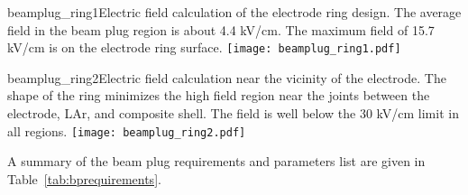 \begin{cdrfigure}{beamplug_ring1}{Electric field calculation of the electrode ring design. The average field in the beam plug region is about 4.4 kV/cm. The maximum field of 15.7 kV/cm is on the electrode ring surface. }
  \texttt{[image: beamplug\_ring1.pdf]}
\end{cdrfigure}

\begin{cdrfigure}{beamplug_ring2}{Electric field calculation near the vicinity of the electrode. The shape of the ring minimizes the high field region near the joints between the electrode, LAr, and composite shell. The field is well below the 30 kV/cm limit in all regions.}
  \texttt{[image: beamplug\_ring2.pdf]}
\end{cdrfigure}

A summary of the beam plug requirements and parameters list are given in Table~\ref{tab:bprequirements}.

